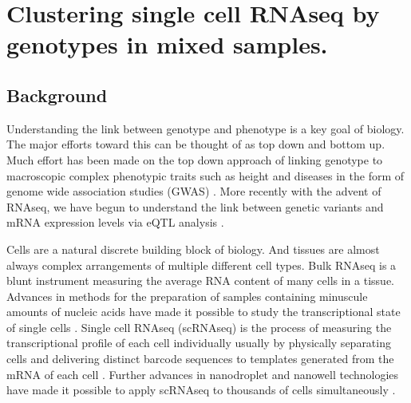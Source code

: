 
\chapter{Clustering single cell RNAseq by genotypes in mixed samples.}

\ifpdf
    \graphicspath{{Chapter2/Figs/Raster/}{Chapter2/Figs/PDF/}{Chapter2/Figs/}}
\else
    \graphicspath{{Chapter2/Figs/Vector/}{Chapter2/Figs/}}
\fi



\section{Background}
Understanding the link between genotype and phenotype is a key goal of biology. The major efforts toward this can be thought of as 
top down and bottom up. Much effort has been made on the top down approach of  
linking genotype to macroscopic complex phenotypic traits such as height and diseases in the form of genome wide association studies (GWAS) \cite{GWAS}. 
More recently with the advent of RNAseq, we have begun to understand the link between genetic variants and mRNA expression levels via eQTL analysis \cite{eQTL}. 

Cells are a natural discrete building block of biology. And tissues are almost always complex arrangements of multiple different cell types. Bulk RNAseq is a blunt 
instrument measuring the average RNA content of many cells in a tissue. 
Advances in methods for the preparation of samples containing minuscule amounts of nucleic acids have made it possible to study the transcriptional state of single cells \cite{first_singlecell}.
Single cell RNAseq (scRNAseq) is the process of measuring the transcriptional profile of each cell individually usually by physically separating cells and delivering distinct barcode sequences to templates generated from the mRNA of each cell \cite{smartseq2}.
Further advances in nanodroplet and nanowell technologies have made it possible to apply scRNAseq to thousands of cells simultaneously \cite{dropseq}\cite{10xsinglecell}\cite{seqwell}. 

